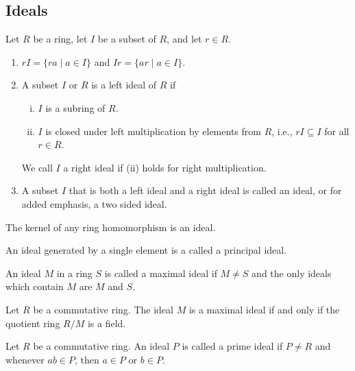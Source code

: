 \subsection{Ideals}

\begin{defn}[Ideal]
  Let $R$ be a ring, let $I$ be a subset of $R$, and let $r \in R$.
  \begin{enumerate}
    \item $rI = \{ra \mid a \in I \}$ and $Ir = \{ar \mid a \in I \}$.
    \item A subset $I$ or $R$ is a left ideal of $R$ if
      \begin{enumerate}[(i)]
        \item $I$ is a subring of $R$.
        \item $I$ is closed under left multiplication by elements from $R$,
        i.e., $rI \subseteq I$ for all $r \in R$.
      \end{enumerate}
    We call $I$ a right ideal if (ii) holds for right multiplication.  
    \item A subset $I$ that is both a left ideal and a right ideal is called an
    ideal, or for added emphasis, a two sided ideal.
  \end{enumerate}
\end{defn}


\begin{remark}
  The kernel of any ring homomorphism is an ideal.
\end{remark}


\begin{defn}
  An ideal generated by a single element is a called a principal ideal.
\end{defn}


\begin{defn}
  An ideal $M$ in a ring $S$ is called a maximal ideal if $M \neq S$ and the
  only ideals which contain $M$ are $M$ and $S$.
\end{defn}


\begin{prop}
  Let $R$ be a commutative ring. The ideal $M$ is a maximal ideal if and only if
  the quotient ring $R/M$ is a field.
\end{prop}


\begin{defn}
  Let $R$ be a commutative ring. An ideal $P$ is called a prime ideal if 
  $P \neq R$ and whenever $ab \in P$, then $a \in P$ or $b \in P$.
\end{defn}



